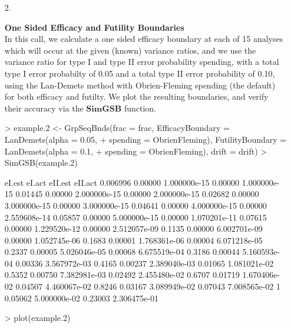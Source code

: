\documentclass{article}
\begin{document}
\begin{itemize}
  \item[2.]{{\bf One Sided Efficacy and Futility Boundaries}\\
    In this call, we calculate a one sided efficacy boundary at each of 15 analyses which will
    occur at the given (known) variance ratios, and we use the variance ratio for type I and
    type II error probability spending, with a total type I error probabilty of 0.05 and a total
    type II error probability of 0.10, using the Lan-Demets method with Obrien-Fleming spending
    (the default) for both efficacy and futilty. We plot the resulting boundaries, and verify
    their accuracy via the $\mathbf{SimGSB}$ function.

\begin{Schunk}
\begin{Sinput}
> example.2 <- GrpSeqBnds(frac = frac, EfficacyBoundary = LanDemets(alpha = 0.05, 
+     spending = ObrienFleming), FutilityBoundary = LanDemets(alpha = 0.1, 
+     spending = ObrienFleming), drift = drift)
> SimGSB(example.2)
\end{Sinput}
\begin{Soutput}
          eI.est       eI.act eII.est      eII.act
0.006996 0.00000 1.000000e-15 0.00000 1.000000e-15
0.01445  0.00000 2.000000e-15 0.00000 2.000000e-15
0.02682  0.00000 3.000000e-15 0.00000 3.000000e-15
0.04641  0.00000 4.000000e-15 0.00000 2.559608e-14
0.05857  0.00000 5.000000e-15 0.00000 1.070201e-11
0.07615  0.00000 1.229520e-12 0.00000 2.512057e-09
0.1135   0.00000 6.002701e-09 0.00000 1.052745e-06
0.1683   0.00001 1.768361e-06 0.00004 6.071218e-05
0.2337   0.00005 5.026046e-05 0.00068 6.675519e-04
0.3186   0.00044 5.160593e-04 0.00336 3.567972e-03
0.4165   0.00237 2.389040e-03 0.01065 1.081021e-02
0.5352   0.00750 7.382981e-03 0.02492 2.455480e-02
0.6707   0.01719 1.670406e-02 0.04507 4.460067e-02
0.8246   0.03167 3.089949e-02 0.07043 7.008565e-02
1        0.05062 5.000000e-02 0.23003 2.306475e-01
\end{Soutput}
\end{Schunk}

\begin{Schunk}
\begin{Sinput}
> plot(example.2)
\end{Sinput}
\end{Schunk}
  }


\end{itemize}
\end{document}
